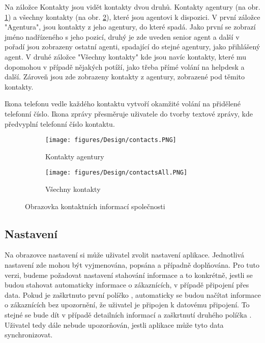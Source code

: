 \documentclass[11pt,twoside,a4paper]{book}
\begin{document}
Na záložce Kontakty jsou vidět kontakty dvou druhů. Kontakty agentury (na obr. \ref{fig:contactscreensa}) a všechny kontakty (na obr. \ref{fig:contactscreensb}), které jsou agentovi k dispozici. V první záložce "Agentura", jsou kontakty z jeho agentury, do které spadá. Jako první se zobrazí jméno nadřízeného s jeho pozicí, druhý je zde uveden senior agent a další v pořadí jsou zobrazeny ostatní agenti, spadající do stejné agentury, jako přihlášený agent. V druhé záložce "Všechny kontakty" kde jsou navíc kontakty, které mu dopomohou v případě nějakých potíží, jako třeba přímé volání na helpdesk a další. Zároveň jsou zde zobrazeny kontakty z agentury,  zobrazené pod těmito kontakty. 

Ikona telefonu vedle každého kontaktu vytvoří okamžité volání na přidělené telefonní číslo. Ikona zprávy přesměruje uživatele do tvorby textové zprávy, kde předvyplní telefonní číslo kontaktu.

\begin{figure}[H]
	\centering
	\begin{subfigure}{.4\textwidth}
	  	\centering
	  	\texttt{[image: figures/Design/contacts.PNG]}
	  	\caption{Kontakty agentury}
	  	\label{fig:contactscreensa}
	\end{subfigure}
	\begin{subfigure}{.4\textwidth}
	  	\centering
		\texttt{[image: figures/Design/contactsAll.PNG]}
	  	\caption{Všechny kontakty}
	  	\label{fig:contactscreensb}
	\end{subfigure}
\caption{Obrazovka kontaktních informací společnosti}
\label{fig:contactscreens}
\end{figure}

\subsection{Nastavení}
Na obrazovce nastavení si může uživatel zvolit nastavení aplikace. Jednotlivá nastavení zde mohou být vyjmenována, popsána a případně doplňována. Pro tuto verzi, budeme požadovat nastavení stahování informace a to konkrétně, jestli se budou stahovat automaticky informace o zákaznících, v případě připojení přes data. Pokud je zaškrtnuto první políčko , automaticky se budou načítat informace o zákaznících bez upozornění, že uživatel je připojen k datovému připojení. To stejné se bude dít v případě detailních informací a zaškrtnutí druhého políčka . Uživatel tedy dále nebude upozorňován, jestli aplikace může tyto data synchronizovat.
\end{document}
